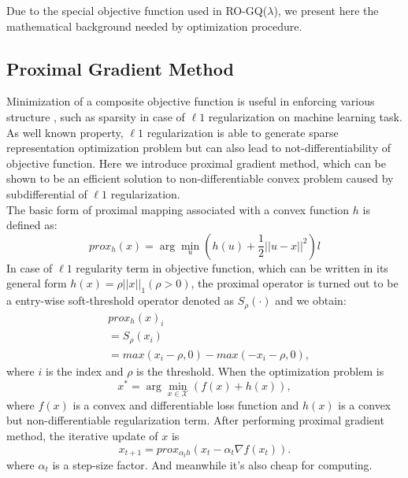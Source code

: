 \documentclass[conference]{IEEEtran}
\begin{document}
Due to the special objective function used in RO-GQ($\lambda$), we present here the mathematical background needed by optimization procedure.
\subsection{Proximal Gradient Method}
Minimization of a composite objective function is useful in enforcing various structure , such as sparsity in case of $\ell1$ regularization on machine learning task. As well known property, $\ell1$ regularization is able to generate sparse representation optimization problem but can also lead to not-differentiability of objective function. Here we introduce proximal gradient method\cite{sra2012optimization}, which can be shown to be an efficient solution to non-differentiable convex problem caused by subdifferential of $\ell1$ regularization.\\
The basic form of proximal mapping associated with a convex function $h$ is defined as:
\begin{equation}
	prox_h(x)=\arg\min_{u}(h(u)+\frac{1}{2}||u-x||^2)l
\end{equation}
In case of $\ell1$ regularity term in objective function, which can be written in its general form $h(x)=\rho||x||_1(\rho > 0)$, the proximal operator is turned out to be a entry-wise soft-threshold operator denoted as $S_\rho(\cdot)$ and we obtain:
\begin{equation}
	\begin{split}
		&prox_h(x)_i\\
		&=S_\rho(x_i)\\
		&=max(x_i-\rho,0)-max(-x_i-\rho, 0),
	\end{split}
\end{equation}
where $i$ is the index and $\rho$ is the threshold. When the optimization problem is 
\begin{equation}
	x^*=\arg\min_{x\in\mathcal{X}}(f(x)+h(x)),
\end{equation}
where $f(x)$ is a convex and differentiable loss function and $h(x)$ is a convex but non-differentiable regularization term. After performing proximal gradient method, the iterative update of $x$ is
\begin{equation}
	x_{t+1}=prox_{\alpha_t h}(x_t-\alpha_t \nabla f(x_t)).
\end{equation}
where $\alpha_t$ is a step-size factor. And meanwhile it's also cheap for computing.
\end{document}
